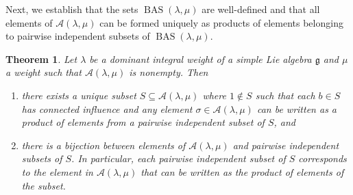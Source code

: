 \documentclass{amsart}
\newtheorem{theorem}{Theorem}[section]
\theoremstyle{definition}
\DeclareMathOperator{\BAS}{BAS}
\newcommand{\calA}{\mathcal{A}}
\begin{document}
Next, we establish that the sets $\BAS(\lambda,\mu)$ are well-defined and that all elements of $\calA(\lambda,\mu)$ can be formed uniquely as products of elements belonging to pairwise independent subsets of $\BAS(\lambda,\mu)$.


\begin{theorem}\label{thm:characterize_BAS}
    Let $\lambda$ be a dominant integral weight of a simple Lie algebra $\mathfrak{g}$ and $\mu$ a weight such that $\calA(\lambda,\mu)$ is nonempty. Then
    
    \begin{enumerate}[(1)]
        \item there exists a unique subset $S\subseteq \calA(\lambda,\mu)$ where $1\notin S$ such that each $b\in S$ has connected influence and any element $\sigma\in \calA(\lambda,\mu)$ can be written as a product of elements from a pairwise independent subset of $S$, and 
        \item there is a bijection between elements of $\calA(\lambda,\mu)$ and pairwise independent subsets of $S$. In particular, each pairwise independent subset of $S$ corresponds to the element in $\calA(\lambda,\mu)$ that can be written as the product of elements of the subset.
    \end{enumerate}
\end{theorem}
\end{document}
